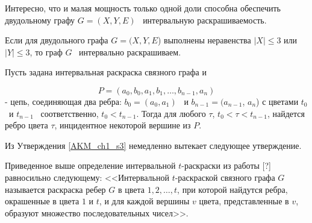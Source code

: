 Интересно, что и малая мощность только одной доли способна обеспечить двудольному графу  $G=(X,Y,E)$ \ интервальную
раскрашиваемость.


\begin{statement}\label{AKM_ch1_s2}
	Если для двудольного графа  $G=(X,Y,E$) выполнены неравенства  $\left|X\right|\leq 3$ или
	$\left|Y\right|\leq 3$, то граф  $G$ \ интервально раскрашиваем.
\end{statement}

\begin{statement}\label{AKM_ch1_s3}
	Пусть задана интервальная раскраска связного графа и
	
	\begin{equation*}
	P=(a_0,b_0,a_1,b_1,\dots ,b_{n-1},a_n)
	\end{equation*}
	- цепь, соединяющая два ребра:  $b_0=(a_0,a_1)$ \ и  $b_{n-1}=(a_{n-1}$,  $a_n$) с цветами  $t_0$ \ и  $t_{n-1}$
	\ соответственно,  $t_0<t_{n-1}$. Тогда для любого  $\tau $,  $t_0<\tau <t_{n-1}$, найдется ребро цвета  $\tau $,
	инцидентное некоторой вершине из  $P$.
\end{statement}

%	

Из Утверждения \ref{AKM_ch1_s3} немедленно вытекает следующее утверждение.

\begin{statement}\label{AKM_ch1_s4}
	Приведенное выше определение интервальной  $t${}-раскраски из работы [?] равносильно следующему:
	<<Интервальной  $t${}-раскраской связного графа  $G$  называется раскраска ребер  $G$  в цвета  $1,2,\dots ,t$, при
	которой найдутся ребра, окрашенные в цвета  $1$  и  $t$, и для каждой вершины  $v$  цвета, представленные в  $v$,
	образуют множество последовательных чисел>>.
\end{statement}


